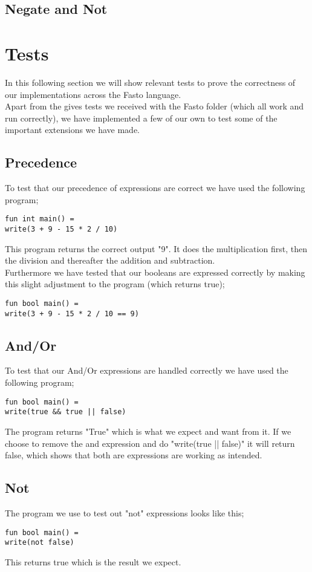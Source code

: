 \documentclass[12pt]{article}
\begin{document}
\subsection{Negate and Not}
\section{Tests}
In this following section we will show relevant tests to prove the correctness of our implementations across the Fasto language.\\
Apart from the gives tests we received with the Fasto folder (which all work and run correctly), we have implemented a few of our own to test some of the important extensions we have made.
\subsection{Precedence}
To test that our precedence of expressions are correct we have used the following program;
\begin{verbatim}
fun int main() =
write(3 + 9 - 15 * 2 / 10)
\end{verbatim}
This program returns the correct output "9". It does the multiplication first, then the division and thereafter the addition and subtraction.\\
Furthermore we have tested that our booleans are expressed correctly by making this slight adjustment to the program (which returns true);
\begin{verbatim}
fun bool main() =
write(3 + 9 - 15 * 2 / 10 == 9)
\end{verbatim}
\subsection{And/Or}
To test that our And/Or expressions are handled correctly we have used the following program;
\begin{verbatim}
fun bool main() =
write(true && true || false)
\end{verbatim}
The program returns "True" which is what we expect and want from it. If we choose to remove the and expression and do "write(true || false)" it will return false, which shows that both are expressions are working as intended.
\subsection{Not}
The program we use to test out "not" expressions looks like this;
\begin{verbatim}
fun bool main() =
write(not false)
\end{verbatim}
This returns true which is the result we expect.
\end{document}
